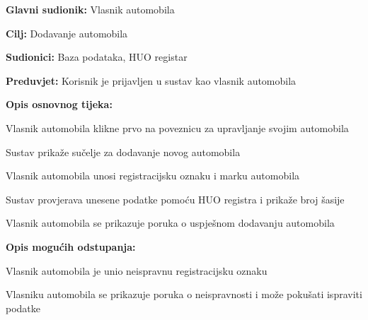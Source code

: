 \noindent {}
\begin{packed_item}
	
	\item \textbf{Glavni sudionik: } Vlasnik automobila
	\item  \textbf{Cilj:} Dodavanje automobila
	\item  \textbf{Sudionici:} Baza podataka, HUO registar
	\item  \textbf{Preduvjet:} Korisnik je prijavljen u sustav kao vlasnik automobila
	\item  \textbf{Opis osnovnog tijeka:}
	
	\item[] \begin{packed_enum}
		
		\item Vlasnik automobila klikne prvo na poveznicu za upravljanje svojim automobila
		\item Sustav prikaže sučelje za dodavanje novog automobila
		\item Vlasnik automobila unosi registracijsku oznaku i marku automobila
		\item Sustav provjerava unesene podatke pomoću HUO registra i prikaže
		broj šasije
		\item Vlasnik automobila se prikazuje poruka o uspješnom dodavanju automobila
		
	\end{packed_enum}
	
	\item  \textbf{Opis mogućih odstupanja:}
	
	\item[] \begin{packed_item}
		
		\item[4.a] Vlasnik automobila je unio neispravnu registracijsku oznaku
		\item[] \begin{packed_enum}
			
			\item Vlasniku automobila se prikazuje poruka o neispravnosti i može
			pokušati ispraviti podatke
			
		\end{packed_enum}
		
	\end{packed_item}
\end{packed_item}

